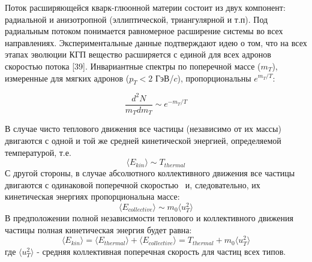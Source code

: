 \begin{comment}
Суть релятивистской гидродинамики можно кратко изложить с помощью основных уравнений \cite{Flow1}. Тензор напряжения определяется согласно следующему выражению:
\begin{equation}
	T^{\mu \nu}(x) = (\varepsilon(x)+p(x))u^{\mu}(x)u^{\nu}(x)+p(x)g^{\mu \nu}
	\label{eq:StressEnergyTensor}
\end{equation}
где $\varepsilon$ - плотность энергии, $p$ - давление, $u^{\mu}(x) = \gamma(1, v_x, v_y, v_z)$ - четырехвектор скорости, $\gamma = 1/ \sqrt{1 - v_x^2 - v_y^2 - v_z^2}$ - Лоренц-фактор, $g^{\mu \nu}$ - метрический тензор. Сохраняющиеся токи имеют вид $j_i^{\mu}(x) = n_i(x)u^{\mu}(x)$, где $n_i(x)$ - плотности чисел сохраняющихся величин (обычно заряда, барионного числа и странности). 

\begin{equation}
	\partial_{\mu}T^{\mu \nu}(x) = 0; \partial_{\mu}j^{\mu}_i(x) = 0
	\label{eq:HydronergyConvLaw}
\end{equation}

Законы сохранения \ref{eq:HydronergyConvLaw} определяют уравнения движения.  Количеству сохраняемых величин $k$ соответствует $2~+~k$ уравнений движения, содержащих $3~+~k$ неизвестных. Таким образом, для определения всех неизвестных необходимо еще одно уравнение. Недостающим уравнением является уравнение состояния, которое связывает плотность энергии, давление и плотность чисел сохраняемых величин. 
Уравнение состояния не может быть определено из первоначальных принципов и составляется с помощью расчетов КХД на решетке. 
\end{comment}

Поток расширяющейся кварк-глюонной материи состоит из двух компонент: радиальной и анизотропной (эллиптической, триангулярной и т.п).
Под радиальным потоком понимается равномерное расширение системы во всех направлениях. Экспериментальные данные подтверждают идею о том, 
что на всех этапах эволюции КГП вещество расширяется с единой для всех адронов скоростью потока [39]. Инвариантные спектры по поперечной массе ($m_T$), измеренные для мягких адронов ($p_T<2$ ГэВ/$c$), пропорциональны $e^{m_T/T}$:

\begin{equation}
	\frac{d^2N}{m_Tdm_T} \sim e^{-m_T/T}
	\label{eq:InvSlopeRon}
\end{equation}

В случае чисто теплового движения все частицы (независимо от их массы) двигаются с одной и той же средней кинетической энергией, определяемой температурой, т.е.
$$\langle E_{kin} \rangle \sim T_{thermal}$$
С другой стороны, в случае абсолютного коллективного движения все частицы двигаются с одинаковой поперечной скоростью \ut \ и, следовательно, их кинетическая энергиях пропорциональна массе:
$$\langle E_{collective} \rangle \sim m_0 \langle u_T ^2 \rangle $$
В предположении полной независимости теплового и коллективного движения частицы полная кинетическая энергия будет равна:
$$ \langle E_{kin} \rangle = \langle E_{thermal} \rangle + \langle E_{collective} \rangle = T_{thermal}+ m_0 \langle u_T ^2 \rangle $$
где $ \langle u_T ^2 \rangle$ - средняя коллективная поперечная скорость для частиц всех типов. 

